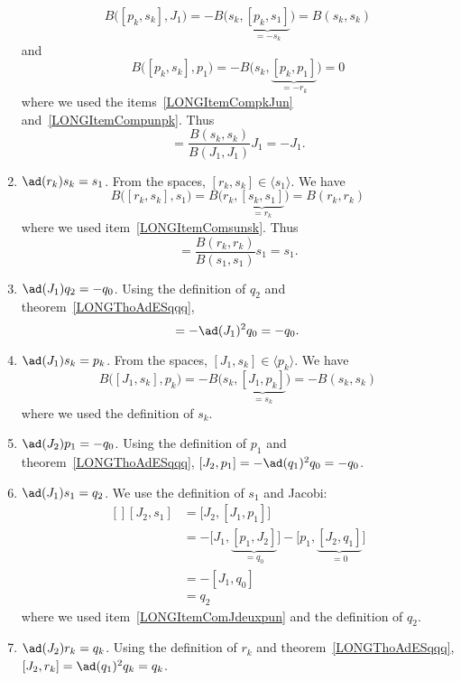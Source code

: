 \begin{enumerate}
		\begin{equation}
			B\big( [p_k,s_k],J_1 \big)=-B\big( s_k,\underbrace{[p_k,s_1]}_{=-s_k} \big)=B(s_k,s_k)
		\end{equation}
		and
		\begin{equation}
			B\big( [p_k,s_k],p_1 \big)=-B\big( s_k,\underbrace{[p_k,p_1]}_{=-r_k} \big)=0
		\end{equation}
		where we used the items~\ref{LONGItemCompkJun} and~\ref{LONGItemCompunpk}. Thus
		\begin{equation}
			[p_k,s_k]=\frac{ B(s_k,s_k) }{ B(J_1,J_1) }J_1=-J_1.
		\end{equation}
	\item$\ad(r_k)s_k=s_1$. From the spaces, $[r_k,s_k]\in\langle s_1\rangle$. We have
		\begin{equation}
			B\big( [r_k,s_k],s_1 \big)=B\big( r_k,\underbrace{[s_k,s_1]}_{=r_k} \big)=B(r_k,r_k)
		\end{equation}
		where we used item~\ref{LONGItemComsunsk}. Thus
		\begin{equation}
			[r_k,s_k]=\frac{ B(r_k,r_k) }{ B(s_1,s_1) }s_1=s_1.
		\end{equation}
	\item$\ad(J_1)q_2=-q_0$. Using the definition of $q_2$ and theorem~\ref{LONGThoAdESqqq},
		\begin{equation}
			[J_1,q_2]=-\ad(J_1)^2q_0=-q_0.
		\end{equation}
	\item$\ad(J_1)s_k=p_k$. From the spaces, $[J_1,s_k]\in\langle p_k\rangle$. We have
		\begin{equation}
			B\big( [J_1,s_k],p_k \big)=-B\big( s_k,\underbrace{[J_1,p_k]}_{=s_k} \big)=-B(s_k,s_k)
		\end{equation}
		where we used the definition of $s_k$.
	\item$\ad(J_2)p_1=-q_0$\label{LONGItemComJdeuxpun}. Using the definition of $p_1$ and theorem~\ref{LONGThoAdESqqq}, $[J_2,p_1]=-\ad(q_1)^2q_0=-q_0$.
	\item$\ad(J_1)s_1=q_2$. We use the definition of $s_1$ and Jacobi:
		\begin{equation}
			\begin{aligned}[]
				[J_2,s_1]&=\big[ J_2,[J_1,p_1] \big]\\
				&=-\big[ J_1,\underbrace{[p_1,J_2]}_{=q_0} \big]-\big[ p_1,\underbrace{[J_2,q_1]}_{=0} \big]\\
				&=-[J_1,q_0]\\
				&=q_2
			\end{aligned}
		\end{equation}
		where we used item~\ref{LONGItemComJdeuxpun} and the definition of $q_2$.
	\item$\ad(J_2)r_k=q_k$. Using the definition of $r_k$ and theorem~\ref{LONGThoAdESqqq}, $[J_2,r_k]=\ad(q_1)^2q_k=q_k$.
\end{enumerate}

